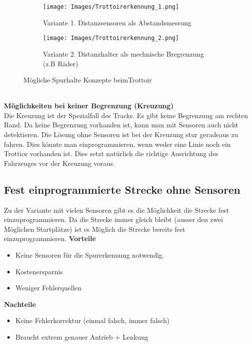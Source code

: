 \begin{figure} [hbp]
	\centering
	\begin{subfigure}[b]{0.4\textwidth}
		\texttt{[image: Images/Trottoirerkennung\_1.png]}
		\caption{Variante 1. Distanzsensoren als Abstandsmessung}
	\end{subfigure}
	\hfill
	\begin{subfigure}[b]{0.4\textwidth}
		\texttt{[image: Images/Trottoirerkennung\_2.png]}
		\caption{Variante 2. Distanzhalter als mechnische Bregrenzung (z.B Räder)}
\end{subfigure}
	\caption{Mögliche Spurhalte Konzepte beimTrottoir}\label{fig:animals}
\end{figure}\\

\textbf {Möglichkeiten bei keiner Begrenzung (Kreuzung)} \\
Die Kreuzung ist der Spezialfall des Tracks. Es gibt keine Begrenzung am rechten Rand. 
Da keine Begrenzung vorhanden ist, kann man mit Sensoren auch nicht detektieren.
Die Lösung ohne Sensoren ist bei der Kreuzung stur geradeaus zu fahren. Dies könnte man einprogrammieren, wenn weder eine Linie noch ein Trottior vorhanden ist. Dies setzt natürlich die richtige Ausrichtung des Fahrzeuges vor der Kreuzung voraus.

\subsection{Fest einprogrammierte Strecke ohne Sensoren}
Zu der Variante mit vielen Sensoren gibt es die Möglichkeit die Strecke fest einzuprogrammieren. Da die Strecke immer gleich bleibt (ausser den zwei Möglichen Startplätze) ist es Möglich die Strecke bereits fest einzuprogrammieren.
\textbf {Vorteile}
\begin{itemize}
\item Keine Sensoren für die Spurerkennung notwendig.
\item Kostenersparnis
\item Weniger Fehlerquellen\\
\end{itemize}
\textbf {Nachteile}
\begin{itemize}
\item Keine Fehlerkorrektur (einmal falsch, immer falsch)
\item Braucht extrem genauer Antrieb + Lenkung
\end{itemize}